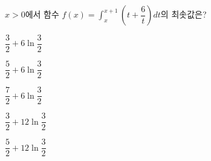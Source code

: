 \hspace*{2mm}\begin{minipage}[t]{\dimexpr\linewidth-2mm\relax}\vspace{0pt}
$x>0$에서 함수 $f(x)=\displaystyle\int_{x}^{x+1}\left(t+\dfrac{6}{t}\right)dt$의 최솟값은?
\begin{choices32}{\rule[-3ex]{0pt}{8ex}$\dfrac{3}{2}+6\ln\dfrac{3}{2}$}{\rule[-3ex]{0pt}{8ex}$\dfrac{5}{2}+6\ln\dfrac{3}{2}$}{\rule[-3ex]{0pt}{8ex}$\dfrac{7}{2}+6\ln\dfrac{3}{2}$}{\rule[-3ex]{0pt}{8ex}$\dfrac{3}{2}+12\ln\dfrac{3}{2}$}{\rule[-3ex]{0pt}{8ex}$\dfrac{5}{2}+12\ln\dfrac{3}{2}$}\end{choices32}\end{minipage}
